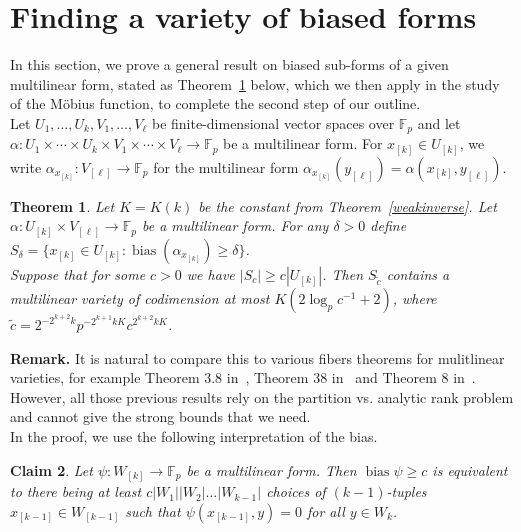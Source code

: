 \documentclass[a4paper,11pt]{article}
\newtheorem{theorem}{Theorem}
\newtheorem{claim}[theorem]{Claim}
\theoremstyle{definition}
\newcommand{\on}[1]{
	\operatorname{#1}
}
\newcommand{\tdt}{\times\cdots\times}
\begin{document}
\vspace{\baselineskip}

\section{Finding a variety of biased forms}

In this section, we prove a general result on biased sub-forms of a given multilinear form, stated as Theorem~\ref{varietyofbiasedmaps} below, which we then apply in the study of the M\"obius function, to complete the second step of our outline.\\
\indent Let $U_1, \dots, U_k, V_1, \dots, V_\ell$ be finite-dimensional vector spaces over $\mathbb{F}_p$ and let $\alpha : U_1 \tdt U_k \times V_1 \tdt V_\ell  \to \mathbb{F}_p$ be a multilinear form. For $x_{[k]} \in U_{[k]}$, we write $\alpha_{x_{[k]}} : V_{[\ell]} \to \mathbb{F}_p$ for the multilinear form $\alpha_{x_{[k]}}(y_{[\ell]}) = \alpha(x_{[k]}, y_{[\ell]})$.

\begin{theorem}\label{varietyofbiasedmaps}
      Let $K = K(k)$ be the constant from Theorem~\ref{weakinverse}.  Let $\alpha : U_{[k]} \times V_{[\ell]} \to \mathbb{F}_p$ be a multilinear form. For any $\delta > 0$ define $S_\delta = \{x_{[k]} \in U_{[k]} : \on{bias}(\alpha_{x_{[k]}}) \geq \delta\}$.\\
        \indent Suppose that  for some $c > 0$ we have $|S_c| \geq c|U_{[k]}|$. Then $S_{\tilde{c}}$ contains a multilinear variety of codimension at most $K(2 \log_p c^{-1} + 2)$, where $\tilde{c} = 2^{-2^{k+2}k}p^{-2^{k+1}k K} c^{2^{k+2}kK}$.
\end{theorem}

\vspace{\baselineskip}

\noindent\textbf{Remark.} It is natural to compare this to various fibers theorems for mulitlinear varieties, for example Theorem 3.8 in~\cite{KazhZieFibres}, Theorem 38 in~\cite{FMulti} and Theorem 8 in~\cite{LukaPrank}. However, all those previous results rely on the partition vs. analytic rank problem and cannot give the strong bounds that we need.\\

In the proof, we use the following interpretation of the bias.\\

\begin{claim}\label{biasinterpretation}
    Let $\psi : W_{[k]} \to \mathbb{F}_p$ be a multilinear form. Then $\on{bias} \psi \geq c$ is equivalent to there being at least $c |W_1||W_2| \dots |W_{k-1}|$ choices of $(k - 1)$-tuples $x_{[k-1]} \in W_{[k-1]}$ such that $\psi(x_{[k-1]}, y) = 0$ for all $y \in W_k$.
\end{claim}
\end{document}
